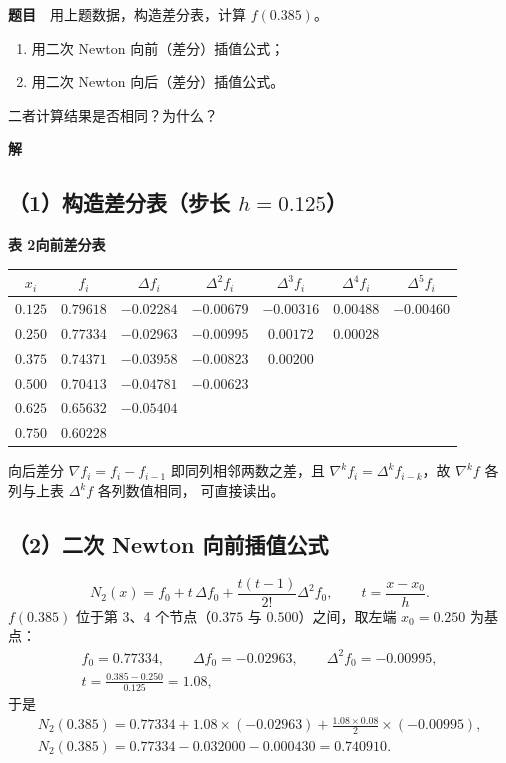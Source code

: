 \documentclass[a4paper,11pt]{ctexart}
\begin{document}
\textbf{题目}　用上题数据，构造差分表，计算 $f(0.385)$。
\begin{enumerate}\setlength{\itemsep}{0.15em}
  \item 用二次 Newton 向前（差分）插值公式；
  \item 用二次 Newton 向后（差分）插值公式。
\end{enumerate}
二者计算结果是否相同？为什么？

\textbf{解}

\subsection*{（1）构造差分表（步长 $h=0.125$）}
\begin{center}
  {\small\bfseries 表 2\quad 向前差分表}\\[0.4em]
  \renewcommand{\arraystretch}{1.2}
  \begin{tabular}{ccccccc}
    \toprule
    $x_i$ & $f_i$ & $\Delta f_i$ & $\Delta^{2}f_i$ & $\Delta^{3}f_i$
          & $\Delta^{4}f_i$ & $\Delta^{5}f_i$ \\
    \midrule
    $0.125$ & $0.79618$ & $-0.02284$ & $-0.00679$ & $-0.00316$ & $0.00488$  & $-0.00460$ \\
    $0.250$ & $0.77334$ & $-0.02963$ & $-0.00995$ & $0.00172$  & $0.00028$  &            \\
    $0.375$ & $0.74371$ & $-0.03958$ & $-0.00823$ & $0.00200$  &            &            \\
    $0.500$ & $0.70413$ & $-0.04781$ & $-0.00623$ &            &            &            \\
    $0.625$ & $0.65632$ & $-0.05404$ &            &            &            &            \\
    $0.750$ & $0.60228$ &            &            &            &            &            \\
    \bottomrule
  \end{tabular}
\end{center}
{\small 向后差分 $\nabla f_i=f_i-f_{i-1}$ 即同列相邻两数之差，且
$\nabla^{k}f_i=\Delta^{k}f_{i-k}$，故 $\nabla^{k}f$ 各列与上表 $\Delta^{k}f$ 各列数值相同，
可直接读出。}

\subsection*{（2）二次 Newton 向前插值公式}
\[
  N_2(x)=f_0+t\,\Delta f_0+\frac{t(t-1)}{2!}\Delta^{2}f_0,
  \qquad t=\frac{x-x_0}{h}.
\]
$f(0.385)$ 位于第 3、4 个节点（$0.375$ 与 $0.500$）之间，取左端 $x_0=0.250$ 为基点：
\begin{gather*}
  f_0=0.77334,\qquad \Delta f_0=-0.02963,\qquad \Delta^{2}f_0=-0.00995,\\
  t=\frac{0.385-0.250}{0.125}=1.08 ,
\end{gather*}
于是
\begin{gather*}
  N_2(0.385)=0.77334+1.08\times(-0.02963)
             +\frac{1.08\times 0.08}{2}\times(-0.00995),\\
  N_2(0.385)=0.77334-0.032000-0.000430=0.740910 .
\end{gather*}
\end{document}
